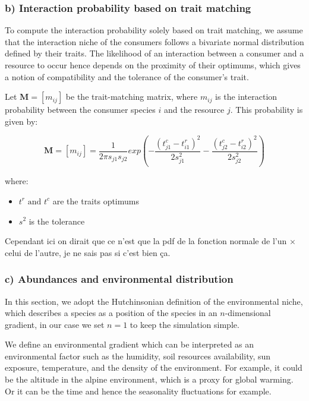 \subsubsection{b) Interaction probability based on trait matching}

To compute the interaction probability solely based on trait matching, we assume that the interaction niche of the consumers follows a bivariate normal distribution defined by their traits. The likelihood of an interaction between a consumer and a resource to occur hence depends on the proximity of their optimums, which gives a notion of compatibility and the tolerance of the consumer's trait.

Let $\mathbf{M} = [m_{ij}]$ be the trait-matching matrix, where $m_{ij}$ is the interaction probability between the consumer species $i$ and the resource $j$. This probability is given by:

$$
    \mathbf{M} = [m_{ij}]=\frac{1}{2\pi s_{j1}s_{j2}} exp\left(-\frac{(t^c_{j1} - t^r_{i1})^2}{2s^2_{j1}} - \frac{(t^c_{j2} - t^r_{i2})^2}{2s^2_{j2}}\right)
$$

where:
\begin{itemize}
    \item $t^r \text{ and }t^c$ are the traits optimums
    \item $s^2$ is the tolerance
\end{itemize}

Cependant ici on dirait que ce n'est que la pdf de la fonction normale de l'un $\times$ celui de l'autre, je ne sais pas si c'est bien ça.




\subsubsection{c) Abundances and environmental distribution}



In this section, we adopt the  Hutchinsonian definition of the environmental niche, which describes a species as a position of the species in an $n$-dimensional gradient, in our case we set $n=1$ to keep the simulation simple.

We define an environmental gradient which can be interpreted as an environmental factor such as the humidity, soil resources availability, sun exposure, temperature, and the density of the environment. For example, it could be the altitude in the alpine environment, which is a proxy for global warming. Or it can be the time and hence the seasonality fluctuations for example.

